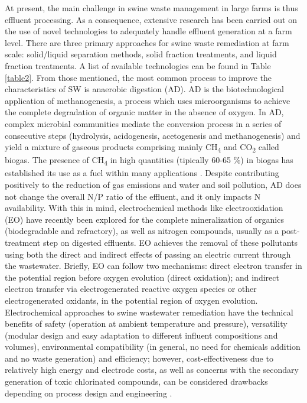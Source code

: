 At present, the main challenge in swine waste management in large farms is thus effluent processing. As a consequence, extensive research has been carried out on the use of novel technologies to adequately handle effluent generation at a farm level. There are three primary approaches for swine waste remediation at farm scale: solid/liquid separation methods, solid fraction treatments, and liquid fraction treatments. A list of available technologies can be found in Table \ref{table2}. From those mentioned, the most common process to improve the characteristics of SW is anaerobic digestion (AD). AD is the biotechnological application of methanogenesis, a process which uses microorganisms to achieve the complete degradation of organic matter in the absence of oxygen. In AD, complex microbial communities mediate the conversion process in a series of consecutive steps (hydrolysis, acidogenesis, acetogenesis and methanogenesis) and yield a mixture of gaseous products comprising mainly CH\textsubscript{4} and CO\textsubscript{2} called biogas. The presence of CH\textsubscript{4} in high quantities (tipically 60-65 \%) in biogas has established its use as a fuel within many applications \cite{Mata_Alvarez_2014,O_Flaherty_2010}. Despite contributing positively to the reduction of gas emissions and water and soil pollution, AD does not change the overall N/P ratio of the effluent, and it only impacts N availability. With this in mind, electrochemical methods like electrooxidation (EO) have recently been explored for the complete mineralization of organics (biodegradable and refractory), as well as nitrogen compounds, usually as a post-treatment step on digested effluents. EO achieves the removal of these pollutants using both the direct and indirect effects of passing an electric current through the wastewater. Briefly, EO can follow two mechanisms: direct electron transfer in the potential region before oxygen evolution (direct oxidation); and indirect electron transfer via electrogenerated reactive oxygen species or other electrogenerated oxidants, in the potential region of oxygen evolution. Electrochemical approaches to swine wastewater remediation have the technical benefits of safety (operation at ambient temperature and pressure), versatility (modular design and easy adaptation to different influent compositions and volumes), environmental compatibility (in general, no need for chemicals addition and no waste generation) and efficiency; however, cost-effectiveness due to relatively high energy and electrode costs, as well as concerns with the secondary generation of toxic chlorinated compounds, can be considered drawbacks depending on process design and engineering \cite{Rajeshwar_1994,Mart_nez_Huitle_2006,Radjenovic_2015}.
